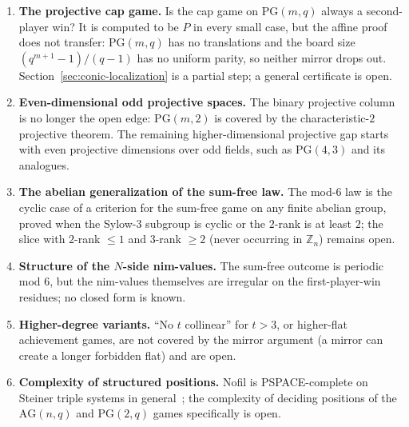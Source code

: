 \documentclass[11pt]{article}
\theoremstyle{plain}
\theoremstyle{definition}
\theoremstyle{remark}
\newcommand{\Zn}[1]{\mathbb{Z}_{#1}}
\newcommand{\AG}{\mathrm{AG}}
\newcommand{\PG}{\mathrm{PG}}
\begin{document}
\begin{enumerate}
  \item \textbf{The projective cap game.} Is the cap game on $\PG(m,q)$ always a second-player win?
    It is computed to be $P$ in every small case, but the affine proof does not transfer:
    $\PG(m,q)$ has no translations and the board size $(q^{m+1}-1)/(q-1)$ has no uniform parity, so
    neither mirror drops out. Section~\ref{sec:conic-localization} is a partial step; a general
    certificate is open.
  \item \textbf{Even-dimensional odd projective spaces.} The binary projective column is no longer
    the open edge: $\PG(m,2)$ is covered by the characteristic-$2$ projective theorem.  The
    remaining higher-dimensional projective gap starts with even projective dimensions over odd
    fields, such as $\PG(4,3)$ and its analogues.
  \item \textbf{The abelian generalization of the sum-free law.} The mod-$6$ law is the cyclic case
    of a criterion for the sum-free game on any finite abelian group, proved when the Sylow-$3$
    subgroup is cyclic or the $2$-rank is at least $2$; the slice with $2$-rank $\leq 1$ and $3$-rank
    $\geq 2$ (never occurring in $\Zn{n}$) remains open.
  \item \textbf{Structure of the $N$-side nim-values.} The sum-free outcome is periodic mod $6$, but
    the nim-values themselves are irregular on the first-player-win residues; no closed form is known.
  \item \textbf{Higher-degree variants.} ``No $t$ collinear'' for $t>3$, or higher-flat achievement
    games, are not covered by the mirror argument (a mirror can create a longer forbidden flat) and
    are open.
  \item \textbf{Complexity of structured positions.} Nofil is PSPACE-complete on Steiner triple
    systems in general~\cite{huggan2022nofil}; the complexity of deciding positions of the
    $\AG(n,q)$ and $\PG(2,q)$ games specifically is open.
\end{enumerate}



\end{document}
